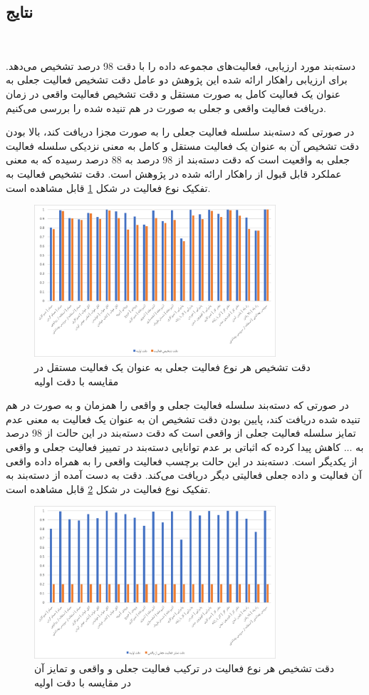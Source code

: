 \subsection{نتایج}‌

دسته‌بند مورد ارزیابی، فعالیت‌های مجموعه داده  را با دقت 98 درصد تشخیص می‌دهد. برای ارزیابی راهکار ارائه شده این پژوهش دو عامل دقت تشخیص فعالیت جعلی به عنوان یک فعالیت کامل به صورت مستقل و دقت تشخیص فعالیت واقعی در زمان دریافت فعالیت واقعی و جعلی به صورت در هم تنیده شده را بررسی می‌کنیم.

 در صورتی که دسته‌بند سلسله فعالیت جعلی را به صورت مجزا دریافت کند، بالا بودن دقت تشخیص آن به عنوان یک فعالیت مستقل و کامل به معنی نزدیکی سلسله فعالیت جعلی به واقعیت است که دقت دسته‌بند از 98 درصد به 88 درصد رسیده که به معنی عملکرد قابل قبول از راهکار ارائه شده در پژوهش است. دقت تشخیص فعالیت به تفکیک نوع فعالیت در شکل \ref{fig:fnatijeh1} قابل مشاهده است.

\begin{figure}[H]
\centerline{\includegraphics[width=0.8\textwidth]{figs/fnatijeh1.png}}
\caption{دقت تشخیص هر نوع فعالیت جعلی به عنوان یک فعالیت مستقل در مقایسه با دقت اولیه}
\label{fig:fnatijeh1}
\end{figure}

در صورتی که دسته‌بند سلسله فعالیت جعلی و واقعی را همزمان و به صورت در هم تنیده شده دریافت کند، پایین بودن دقت تشخیص ان به عنوان یک فعالیت به معنی عدم تمایز سلسله فعالیت جعلی از واقعی است که دقت دسته‌بند در این حالت از 98 درصد به ... کاهش پیدا کرده که اثباتی بر عدم توانایی دسته‌بند در تمییز فعالیت جعلی و واقعی از یکدیگر است. دسته‌بند در این حالت برچسب فعالیت واقعی را به همراه داده واقعی آن فعالیت و داده جعلی فعالیتی دیگر دریافت می‌کند. دقت به دست آمده از دسته‌بند به تفکیک نوع فعالیت در شکل \ref{fig:fnatijeh2} قابل مشاهده است.

\begin{figure}[H]
\centerline{\includegraphics[width=0.8\textwidth]{figs/fnatijeh2.png}}
\caption{دقت تشخیص هر نوع فعالیت در ترکیب فعالیت جعلی و واقعی و تمایز آن در مقایسه با دقت اولیه}
\label{fig:fnatijeh2}
\end{figure}

